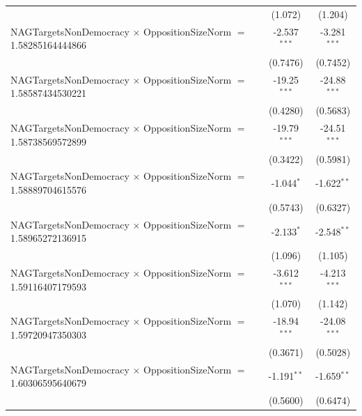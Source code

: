 \begin{tabular}{lcc}
                                                                                & (1.072)              & (1.204)\\   
   NAGTargetsNonDemocracy $\times$ OppositionSizeNorm $=$ 1.58285164444866      & -2.537$^{***}$       & -3.281$^{***}$\\   
                                                                                & (0.7476)             & (0.7452)\\   
   NAGTargetsNonDemocracy $\times$ OppositionSizeNorm $=$ 1.58587434530221      & -19.25$^{***}$       & -24.88$^{***}$\\   
                                                                                & (0.4280)             & (0.5683)\\   
   NAGTargetsNonDemocracy $\times$ OppositionSizeNorm $=$ 1.58738569572899      & -19.79$^{***}$       & -24.51$^{***}$\\   
                                                                                & (0.3422)             & (0.5981)\\   
   NAGTargetsNonDemocracy $\times$ OppositionSizeNorm $=$ 1.58889704615576      & -1.044$^{*}$         & -1.622$^{**}$\\   
                                                                                & (0.5743)             & (0.6327)\\   
   NAGTargetsNonDemocracy $\times$ OppositionSizeNorm $=$ 1.58965272136915      & -2.133$^{*}$         & -2.548$^{**}$\\   
                                                                                & (1.096)              & (1.105)\\   
   NAGTargetsNonDemocracy $\times$ OppositionSizeNorm $=$ 1.59116407179593      & -3.612$^{***}$       & -4.213$^{***}$\\   
                                                                                & (1.070)              & (1.142)\\   
   NAGTargetsNonDemocracy $\times$ OppositionSizeNorm $=$ 1.59720947350303      & -18.94$^{***}$       & -24.08$^{***}$\\   
                                                                                & (0.3671)             & (0.5028)\\   
   NAGTargetsNonDemocracy $\times$ OppositionSizeNorm $=$ 1.60306595640679      & -1.191$^{**}$        & -1.659$^{**}$\\   
                                                                                & (0.5600)             & (0.6474)\\   

\end{tabular}
